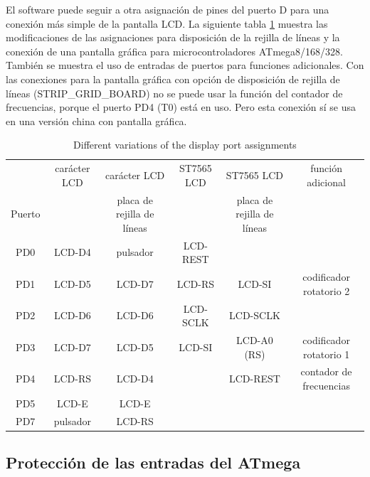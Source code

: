 El software puede seguir a otra asignación de pines del puerto  D para una conexión más simple de la pantalla LCD. La
siguiente tabla \ref{tab:grid-change} muestra las modificaciones de  las asignaciones para disposición de la rejilla de
líneas y la conexión  de una pantalla gráfica para microcontroladores ATmega8/168/328. También  se muestra el uso de
entradas de puertos para funciones adicionales. Con las conexiones para la pantalla gráfica con opción de disposición
de rejilla de  líneas (STRIP\_GRID\_BOARD) no se puede usar  la función del contador de frecuencias,  porque el puerto
PD4 (T0) está en uso. Pero esta conexión sí se usa en una versión china con pantalla gráfica.


\begin{table}[H]
  \begin{center}
    \begin{tabular}{| c || c | c | c | c | c |}
    \hline
           & carácter LCD & carácter LCD    & ST7565 LCD & ST7565 LCD       & función adicional \\
      Puerto &               & placa de rejilla de líneas &            & placa de rejilla de líneas &  \\
    \hline
    \hline
    PD0    &  LCD-D4       &  pulsador      &  LCD-REST    &                  &  \\
    \hline
    PD1    &  LCD-D5       &  LCD-D7        &  LCD-RS      & LCD-SI           & codificador rotatorio 2  \\
    \hline
    PD2    &  LCD-D6       &  LCD-D6        &  LCD-SCLK    & LCD-SCLK         &  \\
    \hline
    PD3    &  LCD-D7       &  LCD-D5        &  LCD-SI      & LCD-A0 (RS)      & codificador rotatorio 1 \\
    \hline
    PD4    &  LCD-RS       &  LCD-D4        &              & LCD-REST         & contador de frecuencias \\
    \hline
    PD5    &  LCD-E        &  LCD-E         &              &                  &  \\
    \hline
    PD7    &  pulsador     &  LCD-RS        &              &                  &  \\
    \hline
    \end{tabular}
  \end{center}
  \caption{Different variations of the display port assignments}
  \label{tab:grid-change}
\end{table}


\subsection{Protección de las entradas del ATmega}

